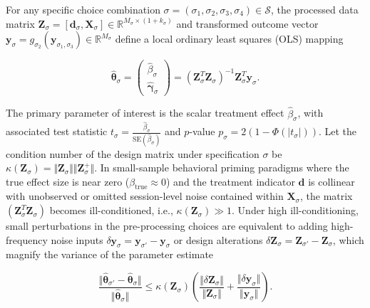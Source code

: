 \documentclass{article}
\theoremstyle{definition}
\begin{document}
\noindent
For any specific choice combination $\sigma = (\sigma_1, \sigma_2, \sigma_3, \sigma_4) \in \mathcal{S}$, the processed data matrix $\mathbf{Z}_\sigma = [\mathbf{d}_\sigma, \mathbf{X}_\sigma] \in \mathbb{R}^{M_\sigma \times (1+k_\sigma)}$ and transformed outcome vector $\mathbf{y}_\sigma = g_{\sigma_2}(\mathbf{y}_{\sigma_1, \sigma_3}) \in \mathbb{R}^{M_\sigma}$ define a local ordinary least squares (OLS) mapping

\begin{equation}
\hat{\boldsymbol{\theta}}_\sigma = \begin{pmatrix} \hat{\beta}_\sigma \\ \hat{\boldsymbol{\gamma}}_\sigma \end{pmatrix} = (\mathbf{Z}_\sigma^T \mathbf{Z}_\sigma)^{-1} \mathbf{Z}_\sigma^T \mathbf{y}_\sigma.
\end{equation}

\noindent
The primary parameter of interest is the scalar treatment effect $\hat{\beta}_\sigma$, with associated test statistic $t_\sigma = \frac{\hat{\beta}_\sigma}{\text{SE}(\hat{\beta}_\sigma)}$ and $p$-value $p_\sigma = 2(1 - \Phi(\vert{}t_\sigma\vert{}))$. Let the condition number of the design matrix under specification $\sigma$ be $\kappa(\mathbf{Z}_\sigma) = \Vert{}\mathbf{Z}_\sigma\Vert{} \Vert{}\mathbf{Z}_\sigma^+\Vert{}$. In small-sample behavioral priming paradigms where the true effect size is near zero ($\beta_{\text{true}} \approx 0$) and the treatment indicator $\mathbf{d}$ is collinear with unobserved or omitted session-level noise contained within $\mathbf{X}_\sigma$, the matrix $(\mathbf{Z}_\sigma^T \mathbf{Z}_\sigma)$ becomes ill-conditioned, i.e., $\kappa(\mathbf{Z}_\sigma) \gg 1$. Under high ill-conditioning, small perturbations in the pre-processing choices are equivalent to adding high-frequency noise inputs $\delta \mathbf{y}_\sigma = \mathbf{y}_{\sigma'} - \mathbf{y}_\sigma$ or design alterations $\delta \mathbf{Z}_\sigma = \mathbf{Z}_{\sigma'} - \mathbf{Z}_\sigma$, which magnify the variance of the parameter estimate

\begin{equation}
\frac{\Vert{}\hat{\boldsymbol{\theta}}_{\sigma'} - \hat{\boldsymbol{\theta}}_\sigma\Vert{}}{\Vert{}\hat{\boldsymbol{\theta}}_\sigma\Vert{}} \le \kappa(\mathbf{Z}_\sigma) \left( \frac{\Vert{}\delta \mathbf{Z}_\sigma\Vert{}}{\Vert{}\mathbf{Z}_\sigma\Vert{}} + \frac{\Vert{}\delta \mathbf{y}_\sigma\Vert{}}{\Vert{}\mathbf{y}_\sigma\Vert{}} \right).
\end{equation}
\end{document}
